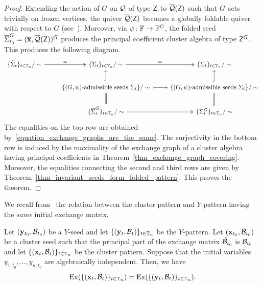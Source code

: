 \begin{proof}
Extending the action of $G$ on $\mathcal{Q}$ of type $\mathsf{Z}$ to  $\overline{\mathcal{Q}}(\mathsf{Z})$ such that $G$ acts trivially on frozen vertices, the quiver $\overline{\mathcal{Q}}(\mathsf{Z})$ becomes a globally foldable quiver with respect to $G$ (see~\cite[Lemma~5.5.3]{FWZ_chapter45}).
Moreover, via $\psi \colon \mathbb{F} \to \mathbb{F}^G$, the folded seed $\overline{\Sigma}_{t_0}^G = (\overline{\mathbf{x}}, \overline{\mathcal{Q}}(\mathsf{Z}))^G$ produces the principal coefficient cluster algebra of type ${\mathsf{Z}^G}$.
This produces the following diagram.
\[
\begin{tikzcd}
\{ \tilde{\seed}_{t}\}_{t \in \mathbb T_n}/\sim
	\arrow[r,twoheadrightarrow, "="]
& \{ \overline{\seed}_{t}\}_{t \in \mathbb T_n}/\sim
	\arrow[r, twoheadrightarrow,"="]
& \{ {\seed}_{t}\}_{t \in \mathbb T_n}/\sim \\
& \{ \text{$(G,\psi)$-admissible seeds $\overline{\seed}_{t}$}\}/\sim
	\arrow[u, hookrightarrow]  
	\arrow[r,rightarrowtail]
	\arrow[d,equal]
&\{ \text{$(G,\psi)$-admissible seeds ${\seed}_{t}$}\}/\sim
	\arrow[u, hookrightarrow]
	\arrow[d,equal] \\
& \{ \overline{\seed}_t^G\}_{t \in \mathbb T_n}/\sim 
\arrow[r,twoheadrightarrow]
& \{{\seed}_t^G\}_{t \in \mathbb T_n}/\sim
\end{tikzcd}
\] 
The equalities on the top row are obtained by~\eqref{equation_exchange_graphs_are_the_same}.
The surjectivity in the bottom row is induced by the maximality of the exchange graph of a cluster algebra having principal coefficients in Theorem~\ref{thm_exchange_graph_covering}. 
Moreover, the equalities connecting the second and third rows are given by Theorem~\ref{thm_invariant_seeds_form_folded_pattern}. 
This proves the theorem.
\end{proof}


We recall from~\cite{CaoHuangLi20} 
the relation between the cluster pattern and $Y$-pattern having the \emph{same} initial exchange matrix.
\begin{proposition}\label{prop_Y-pattern_exchange_graph}
Let $(\mathbf{y}_{t_0}, \mathcal{B}_{t_0})$ be a $Y$-seed and let $\{(\mathbf{y}_t, \mathcal{B}_t)\}_{t \in \mathbb{T}_n}$ be the $Y$-pattern.
Let $(\mathbf{x}_{t_0},\mathcal{\tilde{B}}_{t_0})$ be a cluster seed such that the principal part of the exchange matrix $\mathcal{\tilde{B}}_{t_0}$ is $\mathcal{B}_{t_0}$ and let $\{(\mathbf{x}_t, \mathcal{\tilde{B}}_t)\}_{t \in \mathbb{T}_n}$ be the cluster pattern.
Suppose that the initial variables $y_{1;t_0},\dots,y_{n;t_0}$ are algebraically independent. 
Then, we have
\[
\operatorname{Ex}(\{(\mathbf{x}_t, \mathcal{\tilde{B}}_t)\}_{t \in \mathbb{T}_n}) = 
\operatorname{Ex}(\{(\mathbf{y}_t, \mathcal{B}_t)\}_{t \in \mathbb{T}_n}).
\]
\end{proposition}


